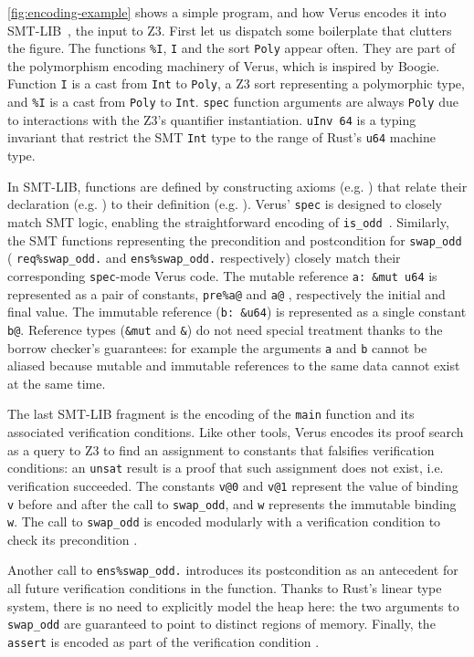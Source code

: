 \autoref{fig:encoding-example} shows a simple program, and how Verus encodes it into SMT-LIB~\cite{smtlib}, the input to Z3.
First let us dispatch some boilerplate that clutters the figure.
The functions \verb`%I`, \verb`I` and the sort \verb`Poly` appear often. They are part of the polymorphism encoding machinery of Verus,
which is inspired by Boogie\cite{poly-boogie}. Function \verb`I` is a cast from \verb`Int` to \verb`Poly`, a Z3 sort
representing a polymorphic type, and \verb`%I` is a cast from \verb`Poly` to \verb`Int`. \verb`spec` function arguments
are always \verb`Poly` due to interactions with the Z3's quantifier instantiation.
\verb`uInv 64`  is a typing invariant that restrict the SMT \verb`Int`
type to the range of Rust's \verb`u64` machine type.

In SMT-LIB, functions are defined by constructing axioms (e.g. )
that relate their declaration (e.g. ) to their definition (e.g. ).
Verus' \verb`spec` is designed to closely match SMT logic, enabling the straightforward encoding of \verb`is_odd`~.
Similarly, the SMT functions representing the precondition and postcondition for \verb`swap_odd` (
\verb`req%swap_odd.`  and \verb`ens%swap_odd.`  respectively)
closely match their corresponding \verb`spec`-mode Verus code.
The mutable reference \verb`a: &mut u64` is represented as a pair of constants, \verb`pre%a@` and \verb`a@` ,
respectively the initial and final value. The immutable reference (\verb`b: &u64`) is represented as a single constant \verb`b@`.
Reference types (\verb`&mut` and \verb`&`) do not need special treatment
thanks to the borrow checker's guarantees:
for example the arguments \verb`a` and \verb`b` cannot be aliased because mutable and immutable
references to the same data cannot exist at the same time.

The last SMT-LIB fragment is the encoding of the \verb`main` function and its associated verification conditions.
Like other tools, Verus encodes its proof search as a query to Z3 to find an assignment to constants that
falsifies  verification conditions: an \verb`unsat` result is a proof that such assignment does not
exist, i.e. verification succeeded.
The constants \verb`v@0` and \verb`v@1` represent the value of binding \verb`v` before and after the call to
\verb`swap_odd`, and \verb`w` represents the immutable binding \verb`w`.
The call to \verb`swap_odd` is encoded modularly with a verification condition to check its precondition .

Another call to \verb`ens%swap_odd.` introduces its postcondition as an antecedent for all future verification
conditions in the function.
Thanks to Rust's linear type system, there is no need to explicitly model the heap here: the two arguments to \verb`swap_odd`
are guaranteed to point to distinct regions of memory.
Finally, the \verb`assert` is encoded as part of the verification condition .


